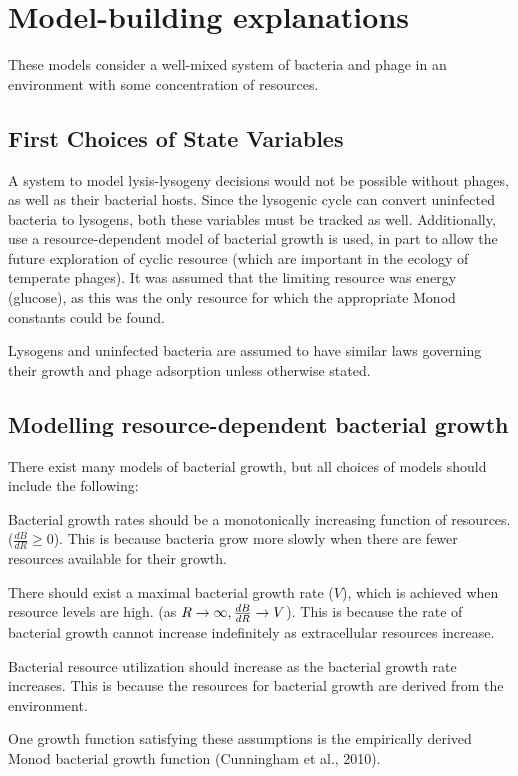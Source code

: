 \documentclass{article}
\begin{document}
\section{Model-building explanations}
 These models consider a well-mixed system of bacteria and phage in an environment with some concentration of resources.

\subsection{First Choices of State Variables}
A system to model lysis-lysogeny decisions would not be possible without phages, as well as their bacterial hosts. Since the lysogenic cycle can convert uninfected bacteria to lysogens, both these variables must be tracked as well. Additionally, use a resource-dependent model of bacterial growth is used, in part to allow the future exploration of cyclic resource (which are important in the ecology of temperate phages). It was assumed that the limiting resource was energy (glucose), as this was the only resource for which the appropriate Monod constants could be found.

Lysogens and uninfected bacteria are assumed to have similar laws governing their growth and phage adsorption unless otherwise stated.

\subsection{Modelling resource-dependent bacterial growth}
There exist many models of bacterial growth, but all choices of models should include the following:

Bacterial growth rates should be a monotonically increasing function of resources. ($\frac{dB}{dR} \geq 0$). This is because bacteria grow more slowly when there are fewer resources available for their growth. 

There should exist a maximal bacterial growth rate ($V$), which is achieved when resource levels are high. (as $R \rightarrow \infty,  \\ \frac{dB}{dR} \rightarrow V$). This is because the rate of bacterial growth cannot increase indefinitely as extracellular resources increase.

Bacterial resource utilization should increase as the bacterial growth rate increases. This is because the resources for bacterial growth are derived from the environment.

One growth function satisfying these assumptions is the empirically derived Monod bacterial growth function (Cunningham et al., 2010). 
\end{document}

